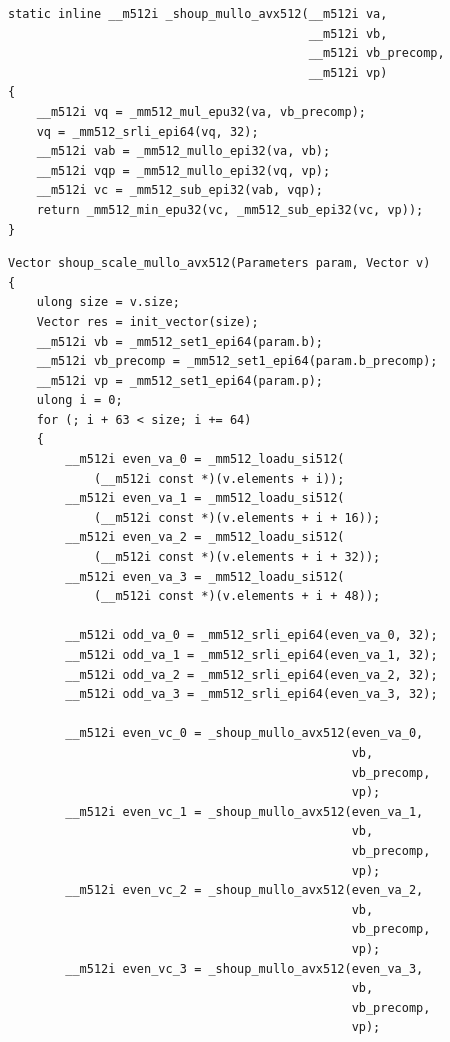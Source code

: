\documentclass{article}
\begin{document}
\begin{lstlisting}[caption = Auxiliary function of Shoup’s modular reduction (version with multiply-low)]
static inline __m512i _shoup_mullo_avx512(__m512i va,
                                          __m512i vb,
                                          __m512i vb_precomp,
                                          __m512i vp)
{
    __m512i vq = _mm512_mul_epu32(va, vb_precomp);
    vq = _mm512_srli_epi64(vq, 32);
    __m512i vab = _mm512_mullo_epi32(va, vb);
    __m512i vqp = _mm512_mullo_epi32(vq, vp);
    __m512i vc = _mm512_sub_epi32(vab, vqp);
    return _mm512_min_epu32(vc, _mm512_sub_epi32(vc, vp));
}
\end{lstlisting}

\begin{lstlisting}[caption = Implementation of Shoup’s modular reduction (version with multiply-low)]
Vector shoup_scale_mullo_avx512(Parameters param, Vector v)
{
    ulong size = v.size;
    Vector res = init_vector(size);
    __m512i vb = _mm512_set1_epi64(param.b);
    __m512i vb_precomp = _mm512_set1_epi64(param.b_precomp);
    __m512i vp = _mm512_set1_epi64(param.p);
    ulong i = 0;
    for (; i + 63 < size; i += 64)
    {
        __m512i even_va_0 = _mm512_loadu_si512(
            (__m512i const *)(v.elements + i));
        __m512i even_va_1 = _mm512_loadu_si512(
            (__m512i const *)(v.elements + i + 16));
        __m512i even_va_2 = _mm512_loadu_si512(
            (__m512i const *)(v.elements + i + 32));
        __m512i even_va_3 = _mm512_loadu_si512(
            (__m512i const *)(v.elements + i + 48));

        __m512i odd_va_0 = _mm512_srli_epi64(even_va_0, 32);
        __m512i odd_va_1 = _mm512_srli_epi64(even_va_1, 32);
        __m512i odd_va_2 = _mm512_srli_epi64(even_va_2, 32);
        __m512i odd_va_3 = _mm512_srli_epi64(even_va_3, 32);

        __m512i even_vc_0 = _shoup_mullo_avx512(even_va_0,
                                                vb,
                                                vb_precomp,
                                                vp);
        __m512i even_vc_1 = _shoup_mullo_avx512(even_va_1,
                                                vb,
                                                vb_precomp,
                                                vp);
        __m512i even_vc_2 = _shoup_mullo_avx512(even_va_2,
                                                vb,
                                                vb_precomp,
                                                vp);
        __m512i even_vc_3 = _shoup_mullo_avx512(even_va_3,
                                                vb,
                                                vb_precomp,
                                                vp);


\end{lstlisting}
\end{document}
